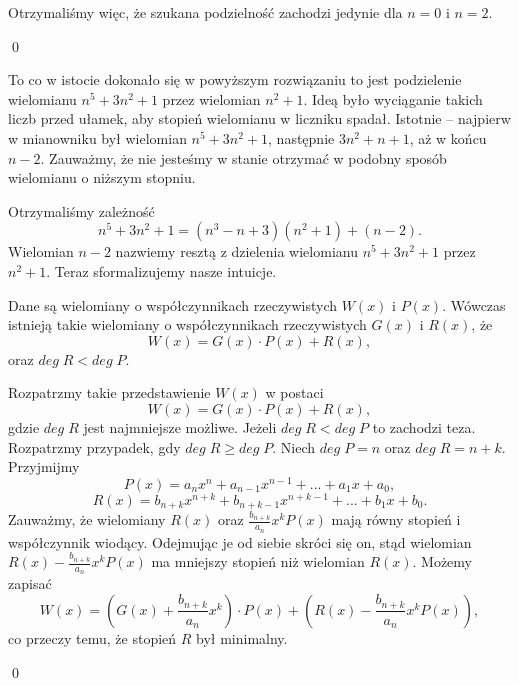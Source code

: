 \vspace{5px}

\noindent
Otrzymaliśmy więc, że szukana podzielność zachodzi jedynie dla $n = 0$ i $n = 2$.

\qed

\noindent 
To co w istocie dokonało się w powyższym rozwiązaniu to jest podzielenie wielomianu $n^5 + 3n^2 + 1$ przez wielomian $n^2 + 1$. Ideą było wyciąganie takich liczb przed ułamek, aby stopień wielomianu w liczniku spadał. Istotnie -- najpierw w mianowniku był wielomian $n^5 + 3n^2 + 1$, następnie $3n^2 + n + 1$, aż w końcu $n - 2$. Zauważmy, że nie jesteśmy w stanie otrzymać w podobny sposób wielomianu o niższym stopniu.

\vspace{5px}
\noindent
Otrzymaliśmy zależność
\[
    n^5 + 3n^2 + 1 = (n^3 - n + 3)(n^2 + 1) + (n - 2).
\]
Wielomian $n - 2$ nazwiemy resztą z dzielenia wielomianu $n^5 + 3n^2 + 1$ przez $n^2 + 1$. Teraz sformalizujemy nasze intuicje.

\vspace{5px}


\noindent
Dane są wielomiany o współczynnikach rzeczywistych $W(x)$ i $P(x)$. Wówczas istnieją takie wielomiany o współczynnikach rzeczywistych $G(x)$ i $R(x)$, że
\[
    W(x) = G(x) \cdot P(x) + R(x),
\]
oraz $deg \; R < deg\; P$. 

\vspace{10px}


\noindent
Rozpatrzmy takie przedstawienie $W(x)$ w postaci
\[
    W(x) = G(x) \cdot P(x) + R(x),
\]
gdzie $deg \; R$ jest najmniejsze możliwe. Jeżeli $deg \; R < deg\; P$ to zachodzi teza. Rozpatrzmy przypadek, gdy $deg \; R \geqslant deg\; P$. Niech $deg \; P = n$ oraz $deg \; R = n + k$. Przyjmijmy
\[
    P(x) =  a_nx^n + a_{n - 1}x^{n - 1} + ... + a_1x + a_0,
\]
\[  
    R(x) = b_{n + k}x^{n + k} + b_{n + k - 1}x^{n + k - 1} + ... + b_1x + b_0.
\]
Zauważmy, że wielomiany $R(x)$ oraz $\frac{b_{n + k}}{a_n}x^kP(x)$ mają równy stopień i współczynnik wiodący. Odejmując je od siebie skróci się on, stąd wielomian $R(x) - \frac{b_{n + k}}{a_n}x^kP(x)$ ma mniejszy stopień niż wielomian $R(x)$. Możemy zapisać
\[
    W(x) = \left(G(x) + \frac{b_{n + k}}{a_n}x^k\right) \cdot  P(x) + \left(R(x) - \frac{b_{n + k}}{a_n}x^kP(x)\right),
\]
co przeczy temu, że stopień $R$ był minimalny.

\qed


